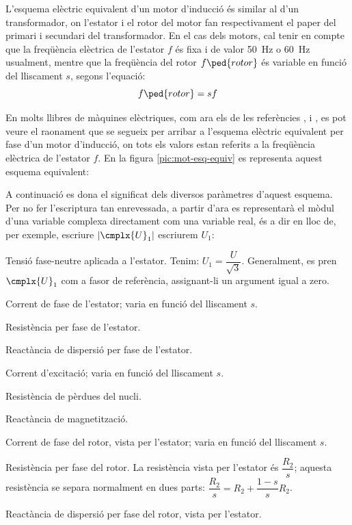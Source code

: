 L'esquema elèctric equivalent d'un motor d'inducció és similar al d'un transformador, on l'estator i el rotor del motor fan respectivament el paper del primari i  secundari del transformador. En el cas dels motors, cal tenir en compte que la freqüència elèctrica de l'estator $f$ és fixa i de valor \qty{50}{Hz} o \qty{60}{Hz} usualment, mentre que la freqüència del rotor $f\ped{rotor}$ és variable en funció del lliscament $s$, segons l'equació:
\begin{equation}
    f\ped{rotor} = s f
\end{equation}

En molts llibres de màquines elèctriques, com ara els de les referències \cite{CHA}, \cite{FIT} i \cite{JFM}, es pot veure el raonament que se segueix per arribar a l'esquema elèctric equivalent per fase d'un motor d'inducció, on tots els valors estan referits a la freqüència elèctrica de l'estator $f$. En la figura \vref{pic:mot-esq-equiv} es representa aquest esquema equivalent:

\begin{center}
    
    \label{pic:mot-esq-equiv}
\end{center}

A continuació es dona el significat dels diversos paràmetres d'aquest esquema. Per no fer l'escriptura tan enrevessada, a partir d'ara es representarà el mòdul d'una variable complexa  directament com una variable real, és a dir en lloc de, per exemple, escriure $|\cmplx{U}_1|$ escriurem $U_1$:

\begin{list}{}
   {\setlength{\labelwidth}{10mm} \setlength{\leftmargin}{15mm} \setlength{\labelsep}{5mm}}
   \item[$\cmplx{U}_1$] Tensió fase-neutre aplicada a l'estator. Tenim: $U_1 = \dfrac{U}{\sqrt{3}}$. Generalment,   es pren $\cmplx{U}_1$ com a fasor de referència, assignant-li un argument igual a zero.
   \item[$\cmplx{I}_1(s)$] Corrent de fase de l'estator; varia en funció del lliscament $s$.
   \item[$R_1$] Resistència per fase de l'estator.
   \item[$X_1$] Reactància de dispersió per fase de l'estator.
   \item[$\cmplx{I}_0(s)$] Corrent d'excitació; varia en funció del lliscament $s$.
   \item[$R\ped{Fe}$] Resistència de pèrdues del nucli.
   \item[$X\ped{m}$] Reactància de magnetització.
   \item[$\cmplx{I}_2(s)$] Corrent de fase del rotor, vista per l'estator; varia en funció del lliscament $s$.
   \item[$R_2$] Resistència per fase del rotor. La resistència vista per l'estator és $\dfrac{R_2}{s}$; aquesta resistència  se separa normalment en dues parts: $\dfrac{R_2}{s} = R_2 + \dfrac{1-s}{s} R_2$.
   \item[$X_2$] Reactància de dispersió per fase del rotor, vista per l'estator.
\end{list}

